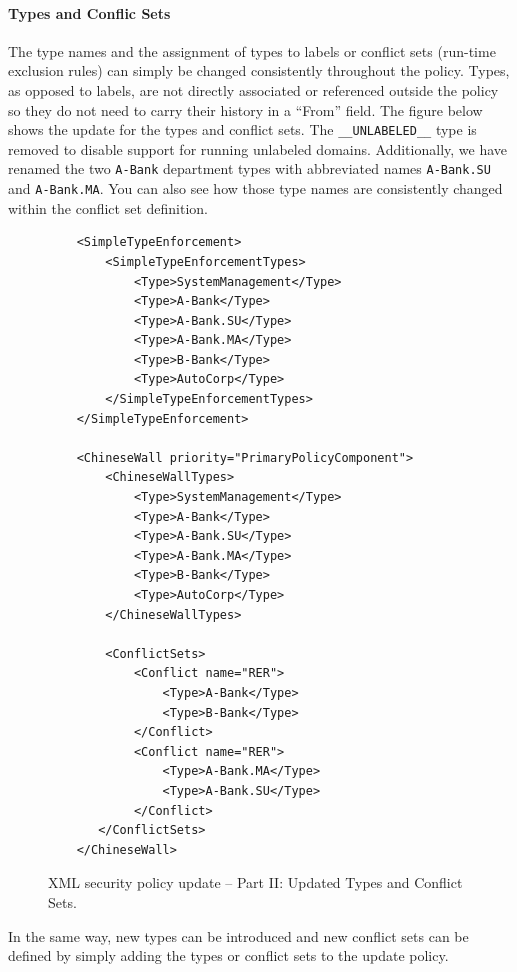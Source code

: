 \documentclass[11pt,twoside,final,openright]{report}
\begin{document}
\paragraph{Types and Conflic Sets}
The type names and the assignment of types to labels or conflict
sets (run-time exclusion rules) can
simply be changed consistently throughout the policy. Types,
as opposed to labels, are not directly associated or referenced
outside the policy so they do not need to carry their history
in a ``From'' field. The figure below shows the update for the
types and conflict sets. The \verb|__UNLABELED__| type is removed
to disable support for running unlabeled domains. Additionally,
we have renamed the two \verb|A-Bank| department types with
abbreviated names \verb|A-Bank.SU| and \verb|A-Bank.MA|. You
can also see how those type names are
consistently changed within the conflict set definition.

\begin{figure}[htb]
\begin{scriptsize}
\begin{verbatim}
    <SimpleTypeEnforcement>
        <SimpleTypeEnforcementTypes>
            <Type>SystemManagement</Type>
            <Type>A-Bank</Type>
            <Type>A-Bank.SU</Type>
            <Type>A-Bank.MA</Type>
            <Type>B-Bank</Type>
            <Type>AutoCorp</Type>
        </SimpleTypeEnforcementTypes>
    </SimpleTypeEnforcement>

    <ChineseWall priority="PrimaryPolicyComponent">
        <ChineseWallTypes>
            <Type>SystemManagement</Type>
            <Type>A-Bank</Type>
            <Type>A-Bank.SU</Type>
            <Type>A-Bank.MA</Type>
            <Type>B-Bank</Type>
            <Type>AutoCorp</Type>
        </ChineseWallTypes>

        <ConflictSets>
            <Conflict name="RER">
                <Type>A-Bank</Type>
                <Type>B-Bank</Type>
            </Conflict>
            <Conflict name="RER">
                <Type>A-Bank.MA</Type>
                <Type>A-Bank.SU</Type>
            </Conflict>
       </ConflictSets>
    </ChineseWall>
\end{verbatim}
\end{scriptsize}
\caption{XML security policy update -- Part II: Updated Types and Conflict Sets.}
\label{fig:acmupdatetypesnrules}
\end{figure}

In the same way, new types can be introduced and new conflict sets
can be defined by simply adding the types or conflict sets to the
update policy.
\end{document}
